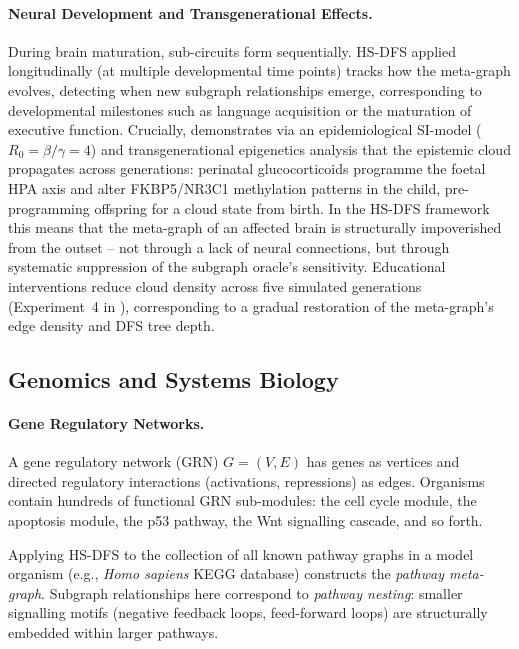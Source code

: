 ﻿\documentclass[12pt,a4paper]{article}
\theoremstyle{plain}
\theoremstyle{definition}
\theoremstyle{remark}
\begin{document}
	\paragraph{Neural Development and Transgenerational Effects.}
	During brain maturation, sub-circuits form sequentially.  HS-DFS applied
	longitudinally (at multiple developmental time points) tracks how the
	meta-graph evolves, detecting when new subgraph relationships emerge,
	corresponding to developmental milestones such as language acquisition
	or the maturation of executive function.  Crucially, \cite{epp2026brain}
	demonstrates via an epidemiological SI-model ($R_0 = \beta/\gamma = 4$)
	and transgenerational epigenetics analysis that the epistemic cloud
	propagates across generations: perinatal glucocorticoids programme the
	foetal HPA axis and alter FKBP5/NR3C1 methylation patterns in the
	child, pre-programming offspring for a cloud state from birth.  In the
	HS-DFS framework this means that the meta-graph of an affected brain
	is structurally impoverished from the outset -- not through a lack of
	neural connections, but through systematic suppression of the subgraph
	oracle's sensitivity.  Educational interventions reduce cloud density
	across five simulated generations (Experiment~4 in \cite{epp2026brain}),
	corresponding to a gradual restoration of the meta-graph's edge density
	and DFS tree depth.
	
	\subsection{Genomics and Systems Biology}
	\label{sec:genomics}
	
	\paragraph{Gene Regulatory Networks.}
	A gene regulatory network (GRN) $G = (V, E)$ has genes as vertices and
	directed regulatory interactions (activations, repressions) as edges.
	Organisms contain hundreds of functional GRN sub-modules: the cell cycle
	module, the apoptosis module, the p53 pathway, the Wnt signalling cascade,
	and so forth.
	
	Applying HS-DFS to the collection of all known pathway graphs in a model
	organism (e.g., \textit{Homo sapiens} KEGG database) constructs the
	\emph{pathway meta-graph}.  Subgraph relationships here correspond to
	\emph{pathway nesting}: smaller signalling motifs (negative feedback loops,
	feed-forward loops) are structurally embedded within larger pathways.
	
\end{document}

